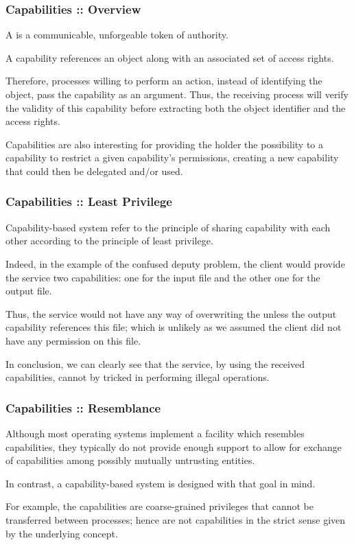 \begin{frame}
  \frametitle{Capabilities :: Overview}

  A  is a communicable, unforgeable token of authority.

  \-

  A capability references an object along with an associated set of access
  rights.

  \-

  Therefore, processes willing to perform an action, instead of identifying
  the object, pass the capability as an argument. Thus, the receiving process
  will verify the validity of this capability before extracting both
  the object identifier and the access rights.

  \-

  Capabilities are also interesting for providing the holder the possibility
  to  a capability \ie{} to restrict a given capability's
  permissions, creating a new capability that could then be delegated and/or
  used.
\end{frame}


\begin{frame}
  \frametitle{Capabilities :: Least Privilege}

  Capability-based system refer to the principle of sharing capability with
  each other according to the principle of least privilege.

  \-

  Indeed, in the example of the confused deputy problem, the client would
  provide the service two capabilities: one for the input file and the other
  one for the output file.

  \-

  Thus, the service would not have any way of overwriting the
   unless the output capability references this file;
  which is unlikely as we assumed the client did not have any permission
  on this file.

  \-

  In conclusion, we can clearly see that the service, by using the received
  capabilities, cannot by tricked in performing illegal operations.
\end{frame}


\begin{frame}
  \frametitle{Capabilities :: Resemblance}

  Although most operating systems implement a facility which resembles
  capabilities, they typically do not provide enough support to allow
  for exchange of capabilities among possibly mutually untrusting entities.

  \-

  In contrast, a capability-based system is designed with that goal in mind.

  \-

  For example, the  capabilities are coarse-grained
  privileges that cannot be transferred between processes; hence are not
  capabilities in the strict sense given by the underlying concept.
\end{frame}

